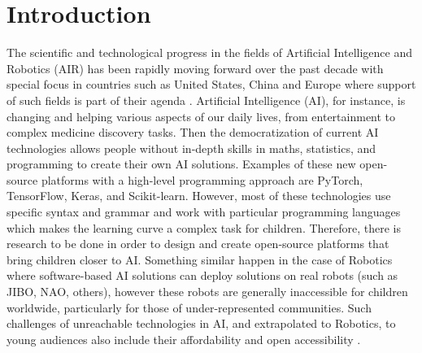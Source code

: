 \documentclass[sigconf]{acmart}
\begin{document}



\maketitle

\section{Introduction} 

\lipsum[2-4]

The scientific and technological progress in the fields of Artificial Intelligence and Robotics (AIR) has been rapidly moving forward over the past decade with special focus in countries such as United States, China and Europe where support of such fields is part of their agenda \cite{Savage2020}. 
Artificial Intelligence (AI), for instance, is changing and helping various aspects of our daily lives, from entertainment to complex medicine discovery tasks. 
Then the democratization of current AI technologies allows people without in-depth skills in maths, statistics, and programming to create their own AI solutions. Examples of these new open-source platforms with a high-level programming approach are PyTorch, TensorFlow, Keras, and Scikit-learn. 
However, most of these technologies use specific syntax and grammar and work with particular programming languages which makes the learning curve a complex task for children. 
Therefore, there is research to be done in order to design and create open-source platforms that bring children closer to AI.
Something similar happen in the case of Robotics where software-based AI solutions can deploy solutions on real robots (such as JIBO, NAO, others), however these robots are generally inaccessible for children worldwide, particularly for those of under-represented communities.
Such challenges of unreachable technologies in AI, and extrapolated to Robotics, to young audiences 
also include their affordability and open accessibility \cite{UNICEF2020}.
\end{document}
